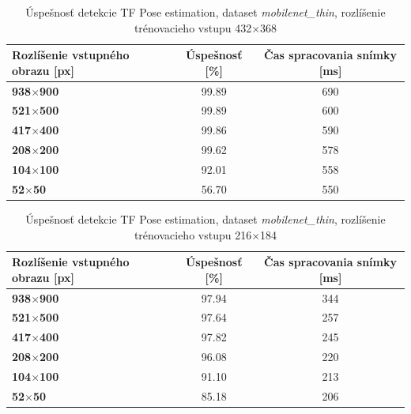 \documentclass[slovak,master,dept460,male,cpp,cpdeclaration]{diploma}
\begin{document}
\begin{table}[H]
\begin{tabular}{|l|c|c|}
\hline
\textbf{Rozlíšenie vstupného obrazu [px]}        & \textbf{Úspešnosť [\%]}  & \textbf{Čas spracovania snímky [ms]} \\ \hline
\textbf{938$\times$900}      & 99.89     & 690        \\ \hline
\textbf{521$\times$500}      & 99.89     & 600     \\ \hline
\textbf{417$\times$400}      & 99.86     &  590    \\ \hline
\textbf{208$\times$200}      & 99.62     &  578    \\ \hline
\textbf{104$\times$100}      & 92.01     &  558    \\ \hline
\textbf{52$\times$50}       &  56.70     & 550     \\ \hline
\end{tabular}

	\caption{Úspešnosť detekcie TF Pose estimation, dataset \textit{mobilenet\_thin}, rozlíšenie trénovacieho vstupu 432$\times$368}
	\label{tab:tf1}
\end{table}


\begin{table}[H]
\begin{tabular}{|l|c|c|}
\hline
\textbf{Rozlíšenie vstupného obrazu [px]}        & \textbf{Úspešnosť [\%]}  & \textbf{Čas spracovania snímky [ms]} \\ \hline
\textbf{938$\times$900}      & 97.94     & 344     \\ \hline
\textbf{521$\times$500}      & 97.64     & 257     \\ \hline
\textbf{417$\times$400}      & 97.82     & 245     \\ \hline
\textbf{208$\times$200}      & 96.08     & 220     \\ \hline
\textbf{104$\times$100}      & 91.10     & 213     \\ \hline
\textbf{52$\times$50}       & 85.18     & 206     \\ \hline
\end{tabular}

	\caption{Úspešnosť detekcie TF Pose estimation, dataset \textit{mobilenet\_thin}, rozlíšenie trénovacieho vstupu 216$\times$184}
	\label{tab:tf2}
\end{table}
\end{document}

